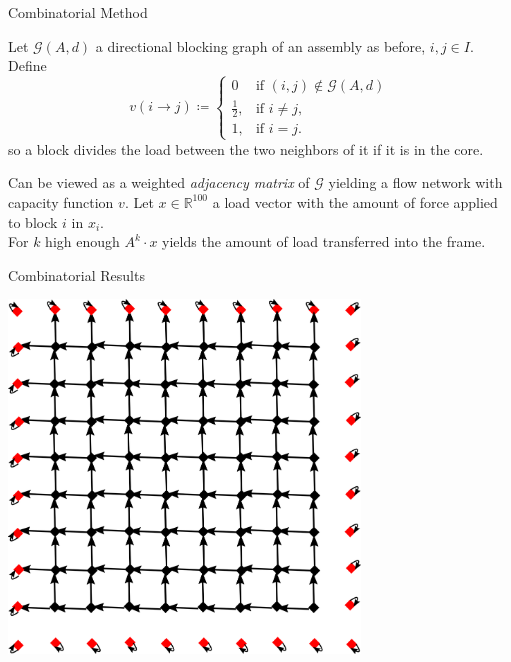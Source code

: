 \documentclass{beamer}
\numberwithin{equation}{aufgabe}
\newcommand\R{\mathbb R}
\begin{document}
\begin{frame}{Combinatorial Method}
    \begin{definition}
        Let $\mathcal{G}(A,d)$ a directional blocking graph of an assembly as before, $i,j \in I$.\\
        Define \pause
        $$v(i\to j) \coloneqq 
            \begin{cases}
                0               & \text{if } (i,j) \notin \mathcal{G}(A,d)\\
                \frac{1}{2},    & \text{if } i\neq j,\\
                1,              & \text{if } i=j.
            \end{cases}$$
        so a block divides the load between the two neighbors of it if it is in the core.
    \end{definition}
    \pause
    Can be viewed as a weighted \emph{adjacency matrix} of $\mathcal{G}$ yielding a flow network with capacity function $v$.
    \pause
    Let $x \in \R^{100}$ a load vector with the amount of force applied to block $i$ in $x_i$.\\ \pause
    For $k$ high enough $A^k \cdot x$ yields the amount of load transferred into the frame.
\end{frame}

\begin{frame}{Combinatorial Results}
    \begin{center}
        \includegraphics[width=0.7\textwidth]{images/flowp1.png}
    \end{center}
\end{frame}
\end{document}

